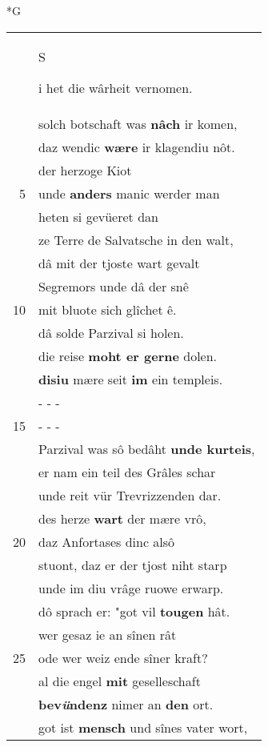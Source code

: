 \documentclass[8pt,a4paper,notitlepage]{article}
\begin{document}
\begin{table}[ht]
\begin{minipage}[t]{0.5\linewidth}
\small
\begin{center}*G
\end{center}
\begin{tabular}{rl}
 & \begin{large}S\end{large}i het die wârheit vernomen.\\ 
 & solch botschaft was \textbf{nâch} ir komen,\\ 
 & daz wendic \textbf{wære} ir klagendiu nôt.\\ 
 & der herzoge Kiot\\ 
5 & unde \textbf{anders} manic werder man\\ 
 & heten si gevüeret dan\\ 
 & ze Terre de Salvatsche in den walt,\\ 
 & dâ mit der tjoste wart gevalt\\ 
 & Segremors unde dâ der snê\\ 
10 & mit bluote sich glîchet ê.\\ 
 & dâ solde Parzival si holen.\\ 
 & die reise \textbf{moht er gerne} dolen.\\ 
 & \textbf{disiu} mære seit \textbf{im} ein templeis.\\ 
 & \multicolumn{1}{l}{ - - - }\\ 
15 & \multicolumn{1}{l}{ - - - }\\ 
 & Parzival was sô bedâht \textbf{unde kurteis},\\ 
 & er nam ein teil des Grâles schar\\ 
 & unde reit vür Trevrizzenden dar.\\ 
 & des herze \textbf{wart} der mære vrô,\\ 
20 & daz Anfortases dinc alsô\\ 
 & stuont, daz er der tjost niht starp\\ 
 & unde im diu vrâge ruowe erwarp.\\ 
 & dô sprach er: "got vil \textbf{tougen} hât.\\ 
 & wer gesaz ie an sînen rât\\ 
25 & ode wer weiz ende sîner kraft?\\ 
 & al die engel \textbf{mit} geselleschaft\\ 
 & \textbf{bev\textit{ü}ndenz} nimer an \textbf{den} ort.\\ 
 & got ist \textbf{mensch} und sînes vater wort,\\ 

\end{tabular}
\end{minipage}
\end{table}
\end{document}
